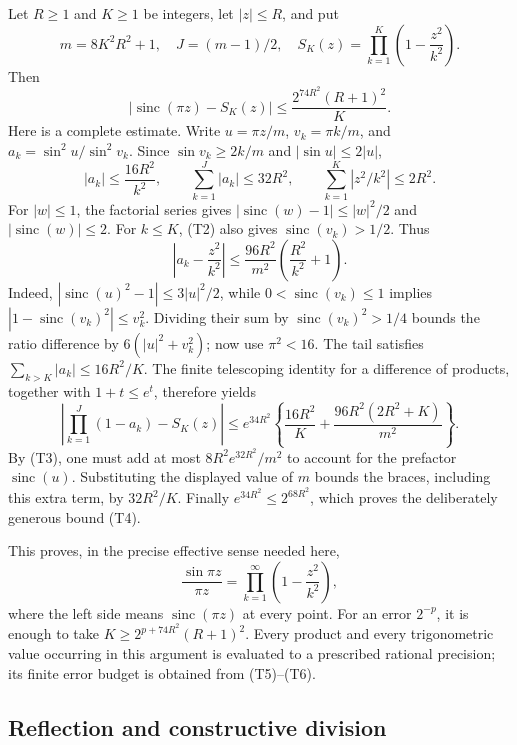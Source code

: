 Let \(R\ge1\) and \(K\ge1\) be integers, let \(|z|\le R\), and put
\[
 m=8K^2R^2+1,\quad J=(m-1)/2,\quad
 S_K(z)=\prod_{k=1}^K\left(1-\frac{z^2}{k^2}\right).
\]
Then
\[
 \left|\operatorname{sinc}(\pi z)-S_K(z)\right|
 \le\frac{2^{74R^2}(R+1)^2}{K}.                         \tag{T4}
\]
Here is a complete estimate. Write
\(u=\pi z/m\), \(v_k=\pi k/m\), and
\(a_k=\sin^2u/\sin^2v_k\). Since
\(\sin v_k\ge2k/m\) and \(|\sin u|\le2|u|\),
\[
 |a_k|\le\frac{16R^2}{k^2},\qquad
 \sum_{k=1}^J|a_k|\le32R^2,
 \qquad \sum_{k=1}^K|z^2/k^2|\le2R^2.                  \tag{T5}
\]
For \(|w|\le1\), the factorial series gives
\(|\operatorname{sinc}(w)-1|\le|w|^2/2\) and
\(|\operatorname{sinc}(w)|\le2\). For \(k\le K\), (T2) also gives
\(\operatorname{sinc}(v_k)>1/2\). Thus
\[
 \left|a_k-\frac{z^2}{k^2}\right|
 \le\frac{96R^2}{m^2}\left(\frac{R^2}{k^2}+1\right).
\]
Indeed, \(|\operatorname{sinc}(u)^2-1|\le3|u|^2/2\), while
\(0<\operatorname{sinc}(v_k)\le1\) implies
\(|1-\operatorname{sinc}(v_k)^2|\le v_k^2\). Dividing their sum by
\(\operatorname{sinc}(v_k)^2>1/4\) bounds the ratio difference by
\(6(|u|^2+v_k^2)\); now use \(\pi^2<16\).
The tail satisfies \(\sum_{k>K}|a_k|\le16R^2/K\). The finite
telescoping identity for a difference of products, together with
\(1+t\le e^t\), therefore yields
\[
 \left|\prod_{k=1}^J(1-a_k)-S_K(z)\right|
 \le e^{34R^2}\left\{\frac{16R^2}{K}
       +\frac{96R^2(2R^2+K)}{m^2}\right\}.              \tag{T6}
\]
By (T3), one must add at most
\(8R^2e^{32R^2}/m^2\) to account for the prefactor
\(\operatorname{sinc}(u)\). Substituting the displayed value of \(m\)
bounds the braces, including this extra term, by \(32R^2/K\).
Finally \(e^{34R^2}\le2^{68R^2}\), which proves the deliberately
generous bound (T4).

This proves, in the precise effective sense needed here,
\[
 \frac{\sin\pi z}{\pi z}
       =\prod_{k=1}^{\infty}\left(1-\frac{z^2}{k^2}\right),             \tag{T7}
\]
where the left side means \(\operatorname{sinc}(\pi z)\) at every
point. For an error \(2^{-p}\), it is enough to take
\(K\ge2^{p+74R^2}(R+1)^2\). Every product and every trigonometric
value occurring in this argument is evaluated to a prescribed rational
precision; its finite error budget is obtained from (T5)--(T6).

\subsection{Reflection and constructive division}

